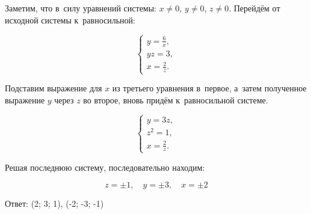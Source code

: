 Заметим, что в~силу уравнений системы: $x \ne 0$, $y \ne 0$, $z \ne 0$.
Перейдём от исходной системы к~равносильной:

\begin{equation*}
\begin{cases}
\displaystyle y = \frac{6}{x}, \\
yz = 3, \\
\displaystyle x = \frac{2}{z}.
\end{cases}
\end{equation*}

Подставим выражение для $x$ из третьего уравнения в~первое,
а~затем полученное выражение $y$ через $z$ во второе,
вновь придём к~равносильной системе.

\begin{equation*}
\begin{cases}
y = 3z, \\
z^{2} = 1, \\
\displaystyle x = \frac{2}{z}.
\end{cases}
\end{equation*}

Решая последнюю систему, последовательно находим:

\begin{equation*}
z = \pm 1, \quad y = \pm 3, \quad x = \pm 2
\end{equation*}

Ответ: (2; 3; 1), (-2; -3; -1)

